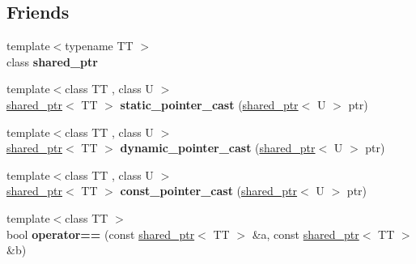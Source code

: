 \subsection*{Friends}
\begin{DoxyCompactItemize}
\item 
\hypertarget{classboost_1_1shared__ptr_ab2104fa6e839672da3c30400e8325e52}{{\footnotesize template$<$typename T\+T $>$ }\\class {\bfseries shared\+\_\+ptr}}\label{classboost_1_1shared__ptr_ab2104fa6e839672da3c30400e8325e52}

\item 
\hypertarget{classboost_1_1shared__ptr_a92b92d2f5fbb783f95ae0c2a9bda1519}{{\footnotesize template$<$class T\+T , class U $>$ }\\\hyperlink{classboost_1_1shared__ptr}{shared\+\_\+ptr}$<$ T\+T $>$ {\bfseries static\+\_\+pointer\+\_\+cast} (\hyperlink{classboost_1_1shared__ptr}{shared\+\_\+ptr}$<$ U $>$ ptr)}\label{classboost_1_1shared__ptr_a92b92d2f5fbb783f95ae0c2a9bda1519}

\item 
\hypertarget{classboost_1_1shared__ptr_aca13cb6d01522700dc8d9257fb25dbf9}{{\footnotesize template$<$class T\+T , class U $>$ }\\\hyperlink{classboost_1_1shared__ptr}{shared\+\_\+ptr}$<$ T\+T $>$ {\bfseries dynamic\+\_\+pointer\+\_\+cast} (\hyperlink{classboost_1_1shared__ptr}{shared\+\_\+ptr}$<$ U $>$ ptr)}\label{classboost_1_1shared__ptr_aca13cb6d01522700dc8d9257fb25dbf9}

\item 
\hypertarget{classboost_1_1shared__ptr_ad5c7d6261c5f5613d20a13852bfb89f6}{{\footnotesize template$<$class T\+T , class U $>$ }\\\hyperlink{classboost_1_1shared__ptr}{shared\+\_\+ptr}$<$ T\+T $>$ {\bfseries const\+\_\+pointer\+\_\+cast} (\hyperlink{classboost_1_1shared__ptr}{shared\+\_\+ptr}$<$ U $>$ ptr)}\label{classboost_1_1shared__ptr_ad5c7d6261c5f5613d20a13852bfb89f6}

\item 
\hypertarget{classboost_1_1shared__ptr_afe4702baf3d516e75cc849338693c235}{{\footnotesize template$<$class T\+T $>$ }\\bool {\bfseries operator==} (const \hyperlink{classboost_1_1shared__ptr}{shared\+\_\+ptr}$<$ T\+T $>$ \&a, const \hyperlink{classboost_1_1shared__ptr}{shared\+\_\+ptr}$<$ T\+T $>$ \&b)}\label{classboost_1_1shared__ptr_afe4702baf3d516e75cc849338693c235}


\end{DoxyCompactItemize}
